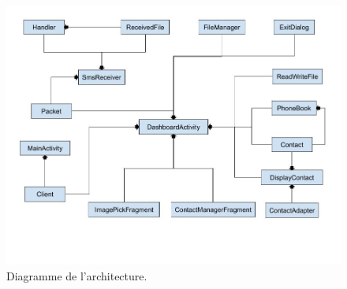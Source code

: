 \begin{figure}[H]
    \includegraphics[width=15cm]{images/architecture.jpg}
    \caption{Diagramme de l'architecture.}
\end{figure}
